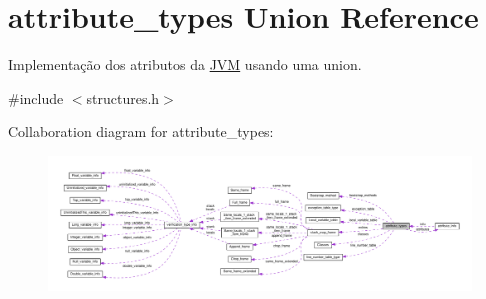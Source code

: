 \hypertarget{unionattribute__types}{}\section{attribute\+\_\+types Union Reference}
\label{unionattribute__types}


Implementação dos atributos da \hyperlink{structJVM}{J\+VM} usando uma union.  




{\ttfamily \#include $<$structures.\+h$>$}



Collaboration diagram for attribute\+\_\+types\+:
\nopagebreak
\begin{figure}[H]
\begin{center}
\leavevmode
\includegraphics[width=350pt]{unionattribute__types__coll__graph}
\end{center}
\end{figure}
